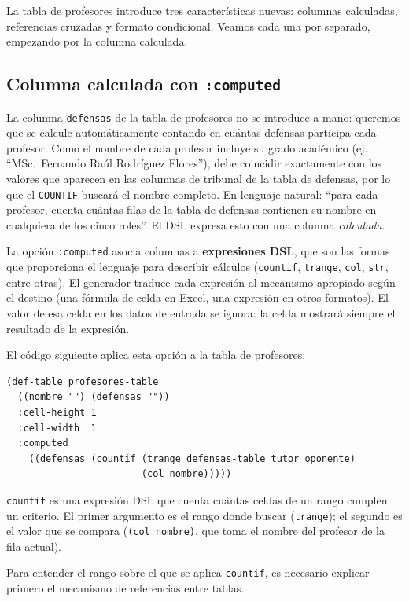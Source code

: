 \documentclass[12pt,a4paper]{report}
\begin{document}
La tabla de profesores introduce tres características nuevas: columnas
calculadas, referencias cruzadas y formato condicional.
Veamos cada una por separado, empezando por la columna calculada.

\subsection{Columna calculada con \texttt{:computed}}

    La columna \texttt{defensas} de la tabla de profesores no se introduce a
    mano: queremos que se calcule automáticamente contando en cuántas defensas
    participa cada profesor.  Como el nombre de cada profesor incluye su grado
    académico (ej. ``MSc.\ Fernando Raúl Rodríguez Flores''), debe coincidir
    exactamente con los valores que aparecen en las columnas de tribunal de la
    tabla de defensas, por lo que el \texttt{COUNTIF} buscará el nombre completo.
    En lenguaje natural: ``para cada profesor, cuenta cuántas filas de la tabla
    de defensas contienen su nombre en cualquiera de los cinco roles''.
    El DSL expresa esto con una columna \emph{calculada}.

La opción \texttt{:computed} asocia columnas a \textbf{expresiones DSL},
que son las formas que proporciona el lenguaje para describir cálculos
(\texttt{countif}, \texttt{trange}, \texttt{col}, \texttt{str}, entre
otras).  El generador traduce cada expresión al mecanismo apropiado
según el destino (una fórmula de celda en Excel, una expresión en otros
formatos).  El valor de esa celda en los datos de entrada se ignora:
la celda mostrará siempre el resultado de la expresión.

El código siguiente aplica esta opción a la tabla de profesores:

\begin{lstlisting}[caption={Columna defensas calculada con COUNTIF.}]
(def-table profesores-table
  ((nombre "") (defensas ""))
  :cell-height 1
  :cell-width  1
  :computed
    ((defensas (countif (trange defensas-table tutor oponente)
                        (col nombre)))))
\end{lstlisting}

\texttt{countif} es una expresión DSL que cuenta cuántas celdas de un rango
cumplen un criterio.  El primer argumento es el rango donde buscar
(\texttt{trange}); el segundo es el valor que se compara
(\texttt{(col nombre)}, que toma el nombre del profesor de la fila actual).

Para entender el rango sobre el que se aplica \texttt{countif},
es necesario explicar primero el mecanismo de referencias entre tablas.
\end{document}
